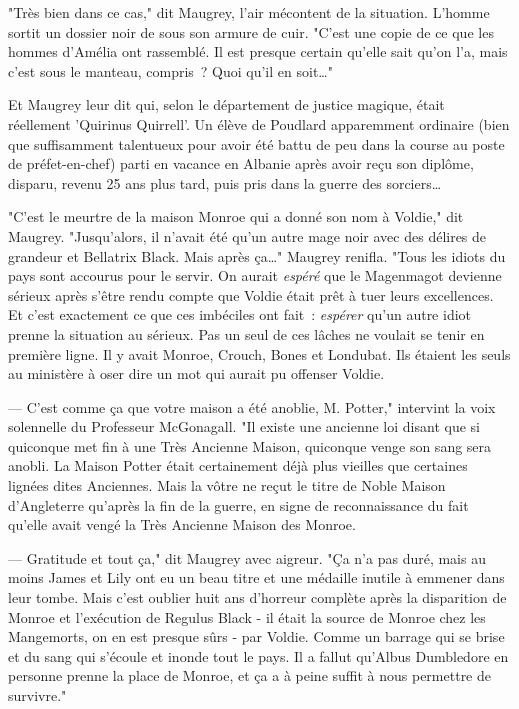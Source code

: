 "Très bien dans ce cas," dit Maugrey, l'air mécontent de la situation. L'homme sortit un dossier noir de sous son armure de cuir. "C'est une copie de ce que les hommes d'Amélia ont rassemblé. Il est presque certain qu'elle sait qu'on l'a, mais c'est sous le manteau, compris~? Quoi qu'il en soit…"

Et Maugrey leur dit qui, selon le département de justice magique, était réellement 'Quirinus Quirrell'. Un élève de Poudlard apparemment ordinaire (bien que suffisamment talentueux pour avoir été battu de peu dans la course au poste de préfet-en-chef) parti en vacance en Albanie après avoir reçu son diplôme, disparu, revenu 25 ans plus tard, puis pris dans la guerre des sorciers…

"C'est le meurtre de la maison Monroe qui a donné son nom à Voldie," dit Maugrey. "Jusqu'alors, il n'avait été qu'un autre mage noir avec des délires de grandeur et Bellatrix Black. Mais après ça…" Maugrey renifla. "Tous les idiots du pays sont accourus pour le servir. On aurait \emph{espéré} que le Magenmagot devienne sérieux après s'être rendu compte que Voldie était prêt à tuer leurs excellences. Et c'est exactement ce que ces imbéciles ont fait~: \emph{espérer} qu'un autre idiot prenne la situation au sérieux. Pas un seul de ces lâches ne voulait se tenir en première ligne. Il y avait Monroe, Crouch, Bones et Londubat. Ils étaient les seuls au ministère à oser dire un mot qui aurait pu offenser Voldie.

--- C'est comme ça que votre maison a été anoblie, M. Potter," intervint la voix solennelle du Professeur McGonagall. "Il existe une ancienne loi disant que si quiconque met fin à une Très Ancienne Maison, quiconque venge son sang sera anobli. La Maison Potter était certainement déjà plus vieilles que certaines lignées dites Anciennes. Mais la vôtre ne reçut le titre de Noble Maison d'Angleterre qu'après la fin de la guerre, en signe de reconnaissance du fait qu'elle avait vengé la Très Ancienne Maison des Monroe.

--- Gratitude et tout ça," dit Maugrey avec aigreur. "Ça n'a pas duré, mais au moins James et Lily ont eu un beau titre et une médaille inutile à emmener dans leur tombe. Mais c'est oublier huit ans d'horreur complète après la disparition de Monroe et l'exécution de Regulus Black - il était la source de Monroe chez les Mangemorts, on en est presque sûrs - par Voldie. Comme un barrage qui se brise et du sang qui s'écoule et inonde tout le pays. Il a fallut qu'Albus Dumbledore en personne prenne la place de Monroe, et ça a à peine suffit à nous permettre de survivre."

